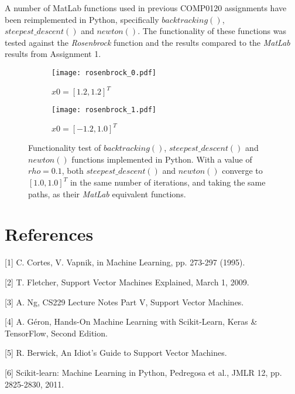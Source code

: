 \documentclass[10pt, a4paper,reqno]{amsart}
\begin{document}
A number of MatLab functions used in previous COMP0120 assignments have been reimplemented in Python, specifically $backtracking()$, $steepest\_descent()$ and $newton()$. The functionality of these functions was tested against the \emph{Rosenbrock} function and the results compared to the \emph{MatLab} results from Assignment 1.

\begin{figure}[H]
	\centering	
	\begin{subfigure}{1.0\textwidth}
		\centering
		\texttt{[image: rosenbrock\_0.pdf]}
		\caption{$x0 = [1.2, 1.2]^T$}
	\end{subfigure}
	\begin{subfigure}{1.0\textwidth}
		\centering
		\texttt{[image: rosenbrock\_1.pdf]}
		\caption{$x0 = [-1.2, 1.0]^T$}
	\end{subfigure}
	\caption{Functionality test of $backtracking()$, $steepest\_descent()$ and $newton()$ functions implemented in Python. With a value of $rho = 0.1$, both $steepest\_descent()$ and $newton()$ converge to $[1.0, 1.0]^T$ in the same number of iterations, and taking the same paths, as their \emph{MatLab} equivalent functions.}
\end{figure}


%
%
\clearpage\section{References}

[1] C. Cortes, V. Vapnik, in Machine Learning, pp. 273-297 (1995).

[2] T. Fletcher, Support Vector Machines Explained, March 1, 2009.

[3] A. Ng, CS229 Lecture Notes Part V, Support Vector Machines.

[4] A. G\'{e}ron, Hands-On Machine Learning with Scikit-Learn, Keras \& TensorFlow, Second Edition.

[5] R. Berwick, An Idiot's Guide to Support Vector Machines.

[6] Scikit-learn: Machine Learning in Python, Pedregosa et al., JMLR 12, pp. 2825-2830, 2011.
\end{document}
